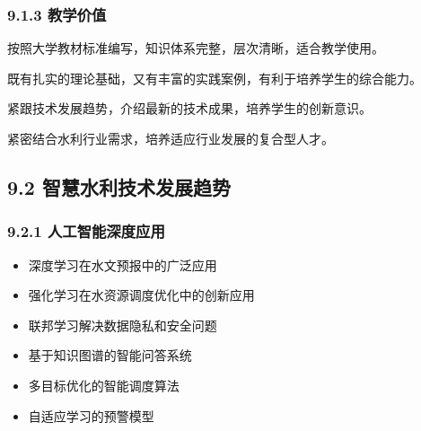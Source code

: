 \hypertarget{ux6559ux5b66ux4ef7ux503c}{%
\subsubsection{9.1.3 教学价值}\label{ux6559ux5b66ux4ef7ux503c}}


按照大学教材标准编写，知识体系完整，层次清晰，适合教学使用。


既有扎实的理论基础，又有丰富的实践案例，有利于培养学生的综合能力。


紧跟技术发展趋势，介绍最新的技术成果，培养学生的创新意识。


紧密结合水利行业需求，培养适应行业发展的复合型人才。

\hypertarget{ux667aux6167ux6c34ux5229ux6280ux672fux53d1ux5c55ux8d8bux52bf}{%
\subsection{9.2 智慧水利技术发展趋势}\label{ux667aux6167ux6c34ux5229ux6280ux672fux53d1ux5c55ux8d8bux52bf}}

\hypertarget{ux4ebaux5de5ux667aux80fdux6df1ux5ea6ux5e94ux7528}{%
\subsubsection{9.2.1 人工智能深度应用}\label{ux4ebaux5de5ux667aux80fdux6df1ux5ea6ux5e94ux7528}}


\begin{itemize}
\tightlist
\item
  深度学习在水文预报中的广泛应用
\item
  强化学习在水资源调度优化中的创新应用
\item
  联邦学习解决数据隐私和安全问题
\end{itemize}


\begin{itemize}
\tightlist
\item
  基于知识图谱的智能问答系统
\item
  多目标优化的智能调度算法
\item
  自适应学习的预警模型
\end{itemize}

